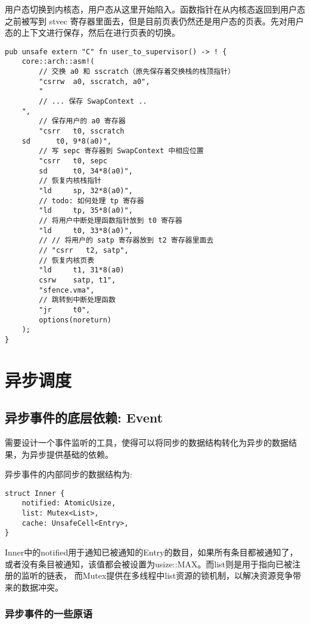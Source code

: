 用户态切换到内核态，用户态从这里开始陷入。函数指针在从内核态返回到用户态之前被写到 stvec 寄存器里面去，但是目前页表仍然还是用户态的页表。先对用户态的上下文进行保存，然后在进行页表的切换。

\begin{lstlisting}[caption=由用户态进入内核态]
pub unsafe extern "C" fn user_to_supervisor() -> ! {
    core::arch::asm!(
        // 交换 a0 和 sscratch（原先保存着交换栈的栈顶指针）
        "csrrw  a0, sscratch, a0",
        "
        // ... 保存 SwapContext ..
    ",
        // 保存用户的 a0 寄存器
        "csrr   t0, sscratch
    sd      t0, 9*8(a0)",
        // 写 sepc 寄存器到 SwapContext 中相应位置
        "csrr   t0, sepc
        sd      t0, 34*8(a0)",
        // 恢复内核栈指针
        "ld     sp, 32*8(a0)",
        // todo: 如何处理 tp 寄存器
        "ld     tp, 35*8(a0)",
        // 将用户中断处理函数指针放到 t0 寄存器
        "ld     t0, 33*8(a0)",
        // // 将用户的 satp 寄存器放到 t2 寄存器里面去
        // "csrr   t2, satp",
        // 恢复内核页表
        "ld     t1, 31*8(a0)
        csrw    satp, t1",
        "sfence.vma",
        // 跳转到中断处理函数
        "jr     t0",
        options(noreturn)
    );
}
\end{lstlisting}


\section{异步调度}

\subsection{异步事件的底层依赖: Event}

需要设计一个事件监听的工具，使得可以将同步的数据结构转化为异步的数据结果，为异步提供基础的依赖。

异步事件的内部同步的数据结构为:

\begin{lstlisting}[caption=异步事件底层的同步结构]
struct Inner {
    notified: AtomicUsize,
    list: Mutex<List>,
    cache: UnsafeCell<Entry>,
}
\end{lstlisting}

Inner中的notified用于通知已被通知的Entry的数目，如果所有条目都被通知了，或者没有条目被通知，该值都会被设置为usize::MAX。而list则是用于指向已被注册的监听的链表， 而Mutex提供在多线程中list资源的锁机制，以解决资源竞争带来的数据冲突。

\subsubsection{异步事件的一些原语}
\label{sssec:event}

